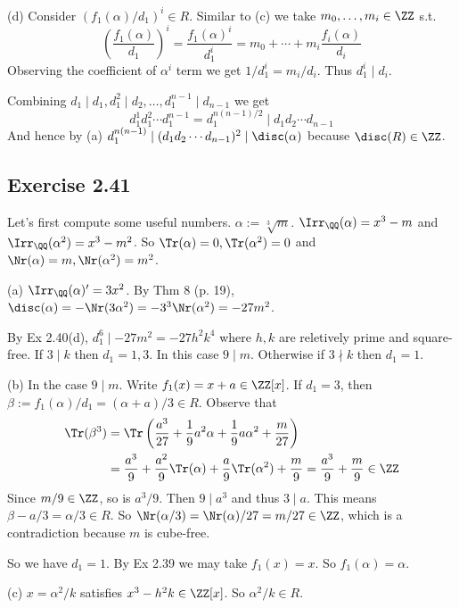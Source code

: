 \documentclass[../Chapter.tex]{subfiles}
\begin{document}
(d) Consider $(f_1(\alpha)/d_1)^i\in R$. Similar to (c) we take $m_0,\ldots,m_i\in\ZZ$ s.t. $$\left(\frac{f_1(\alpha)}{d_1}\right)^i=\frac{f_1(\alpha)^i}{d_1^i}=m_0+\cdots+m_i\frac{f_i(\alpha)}{d_i}$$ Observing the coefficient of $\alpha^i$ term we get $1/d_1^i=m_i/d_i$. Thus $d_1^i\mid d_i$.

Combining $d_1\mid d_1,d_1^2\mid d_2,\ldots,d_1^{n-1}\mid d_{n-1}$ we get $$d_1^1d_1^2\cdots d_1^{n-1}=d_1^{n(n-1)/2}\mid d_1d_2\cdots d_{n-1}$$ And hence by (a) $d_1^{n(n-1)}\mid (d_1d_2\cdots d_{n-1})^2\mid \disc(\alpha)$ because $\disc(R)\in\ZZ$.

\subsection*{Exercise 2.41}

Let's first compute some useful numbers. $\alpha:=\sqrt[3]{m}$. $\Irr_\QQ(\alpha)=x^3-m$ and $\Irr_\QQ(\alpha^2)=x^3-m^2$. So $\Tr(\alpha)=0,\Tr(\alpha^2)=0$ and $\Nr(\alpha)=m,\Nr(\alpha^2)=m^2$.

(a) $\Irr_\QQ(\alpha)'=3x^2$. By Thm 8 (p. 19), $\disc(\alpha)=-\Nr(3\alpha^2)=-3^3\Nr(\alpha^2)=-27m^2$.

By Ex 2.40(d), $d_1^6\mid -27m^2=-27h^2k^4$ where $h,k$ are reletively prime and square-free. If $3\mid k$ then $d_1=1,3$. In this case $9\mid m$. Otherwise if $3\nmid k$ then $d_1=1$.

(b) In the case $9\mid m$. Write $f_1(x)=x+a\in\ZZ[x]$. If $d_1=3$, then $\beta:=f_1(\alpha)/d_1=(\alpha+a)/3\in R$. Observe that
\begin{align*}
\Tr(\beta^3) &= \Tr\left(\frac{a^3}{27}+\frac{1}{9}a^2\alpha+\frac{1}{9}a\alpha^2+\frac{m}{27}\right) \\ 
&= \frac{a^3}{9}+\frac{a^2}{9}\Tr(\alpha)+\frac{a}{9}\Tr(\alpha^2)+\frac{m}{9} = \frac{a^3}{9}+\frac{m}{9} \in\ZZ
\end{align*}
Since $m/9\in\ZZ$, so is $a^3/9$. Then $9\mid a^3$ and thus $3\mid a$. This means $\beta-a/3=\alpha/3\in R$. So $\Nr(\alpha/3)=\Nr(\alpha)/27=m/27\in\ZZ$, which is a contradiction because $m$ is cube-free.

So we have $d_1=1$. By Ex 2.39 we may take $f_1(x)=x$. So $f_1(\alpha)=\alpha$.

(c) $x=\alpha^2/k$ satisfies $x^3-h^2k\in\ZZ[x]$. So $\alpha^2/k\in R$.
\end{document}

